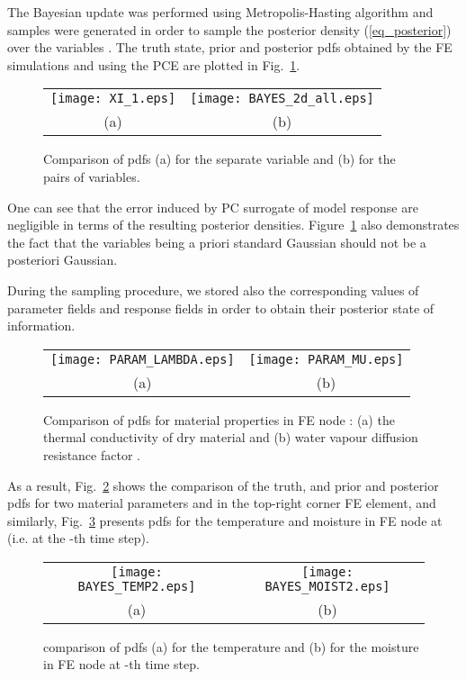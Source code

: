\documentclass[preprint,12pt]{elsarticle}
\begin{document}
The Bayesian update was performed using Metropolis-Hasting
algorithm and  samples were generated in order to sample
the posterior density (\ref{eq_posterior}) over the variables
. The truth state, prior and
posterior pdfs obtained by the FE simulations and using the
PCE are plotted in Fig.~\ref{fig_pdf_xi}.
\begin{figure} [ht!]
\centering
\begin{tabular}{cc}
\texttt{[image: XI\_1.eps]}&
\texttt{[image: BAYES\_2d\_all.eps]}\\
(a)&(b)
\end{tabular}
\caption{Comparison of pdfs (a) for the separate variable  and
  (b) for the pairs of variables.}
\label{fig_pdf_xi}
\end{figure}
One can see that the error induced by PC surrogate of model
response are negligible in terms of the resulting posterior
densities. Figure~\ref{fig_pdf_xi} also demonstrates the fact that
the variables  being a priori standard Gaussian should
not be a posteriori Gaussian.

During the sampling procedure, we stored also the corresponding values
of parameter fields and response fields in order to obtain their
posterior state of information.
\begin{figure} [ht!]
\centering
\begin{tabular}{cc}
\texttt{[image: PARAM\_LAMBDA.eps]}&
\texttt{[image: PARAM\_MU.eps]}\\
(a)&(b)
\end{tabular}
\caption{Comparison of pdfs for material properties in FE node :
  (a) the thermal conductivity of dry material  and (b)
  water vapour diffusion resistance factor .}
\label{fig_pdf_matpar}
\end{figure}
As a result, Fig.~\ref{fig_pdf_matpar} shows the comparison of the
truth, and prior and posterior pdfs for two material parameters
 and  in the top-right corner FE element, and
similarly, Fig.~\ref{fig_pdf_resp} presents pdfs for the
temperature and moisture in FE node  at 
(i.e. at the -th time step).
\begin{figure} [ht!]
\centering
\begin{tabular}{cc}
\texttt{[image: BAYES\_TEMP2.eps]}&
\texttt{[image: BAYES\_MOIST2.eps]}\\
(a)&(b)
\end{tabular}
\caption{comparison of pdfs (a) for the temperature and (b) for the
  moisture in FE node  at -th time step.}
\label{fig_pdf_resp}
\end{figure}
\end{document}
